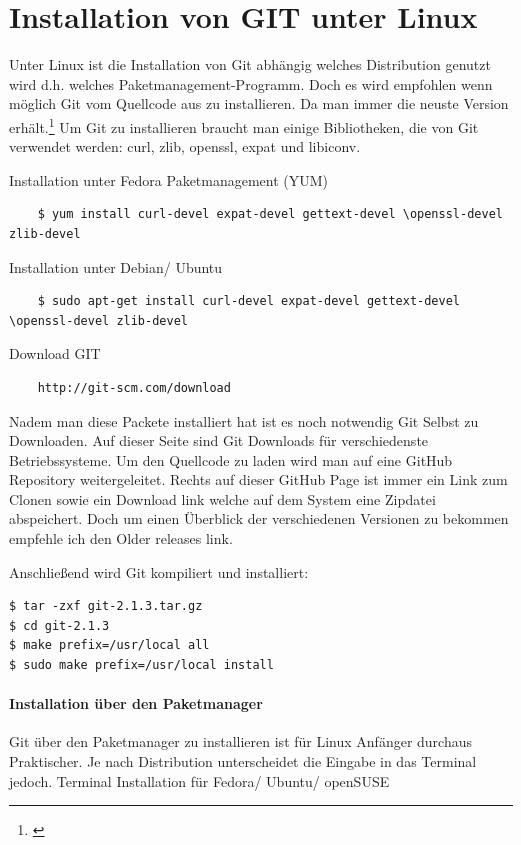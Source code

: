 \documentclass[12pt,a4paper,bibliography=totocnumbered,listof=totocnumbered]{scrartcl}
\begin{document}
\section{Installation von GIT unter Linux}
Unter Linux ist die Installation von Git abhängig welches Distribution genutzt wird d.h. welches Paketmanagement-Programm. Doch es wird empfohlen wenn möglich Git vom Quellcode aus zu installieren. Da man immer die neuste Version erhält.\footnote{\cite{chacon2009pro}} Um Git zu installieren braucht man einige Bibliotheken, die von Git verwendet werden: curl, zlib, openssl, expat und libiconv. 

Installation unter Fedora Paketmanagement (YUM)
\begin{lstlisting}
	$ yum install curl-devel expat-devel gettext-devel \openssl-devel zlib-devel
 \end{lstlisting}

Installation unter Debian/ Ubuntu
\begin{lstlisting}
	$ sudo apt-get install curl-devel expat-devel gettext-devel \openssl-devel zlib-devel
 \end{lstlisting}
 
Download GIT

\begin{lstlisting}
	http://git-scm.com/download
 \end{lstlisting}
 
 
Nadem man diese Packete installiert hat ist es noch notwendig Git Selbst zu Downloaden. Auf dieser Seite sind Git Downloads für verschiedenste Betriebssysteme. Um den Quellcode zu laden wird man auf eine GitHub Repository weitergeleitet. Rechts auf dieser GitHub Page ist immer ein Link zum Clonen sowie ein Download link welche auf dem System eine Zipdatei abspeichert. Doch um einen Überblick der verschiedenen Versionen zu bekommen 
empfehle ich den Older releases  link.

Anschließend wird Git kompiliert und installiert:
\begin{lstlisting}
$ tar -zxf git-2.1.3.tar.gz
$ cd git-2.1.3
$ make prefix=/usr/local all
$ sudo make prefix=/usr/local install
 \end{lstlisting}

\paragraph{Installation über den Paketmanager}

Git über den Paketmanager zu installieren ist für Linux Anfänger durchaus Praktischer. Je nach Distribution unterscheidet die Eingabe in das Terminal jedoch.
\newpage
Terminal Installation für Fedora/ Ubuntu/ openSUSE 
\end{document}
